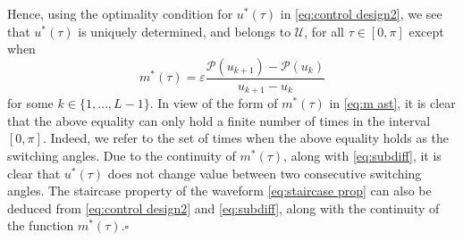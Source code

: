 \documentclass[twocolumn]{autart}    %
\begin{document}
Hence,  using the optimality condition for $u^\ast(\tau)$ in \eqref{eq:control design2}, we see that $u^\ast(\tau)$ is uniquely determined, and belongs to $\mathcal{U}$, for all $\tau\in [0,\pi]$ except when
$$
m^\ast(\tau) = \varepsilon \dfrac{\mathcal{P}(u_{k+1}) - \mathcal{P}(u_k)}{u_{k+1} -u_k}
$$
for some $k\in\{1,\ldots, L-1\}$.
In view of the form of $m^\ast(\tau)$ in \eqref{eq:m ast}, it is clear that the above equality can only hold a finite number of times in the interval $[0,\pi]$. 
Indeed, we refer to the set of times when the above equality holds as the switching angles.
Due to the continuity of $m^\ast(\tau)$, along with \eqref{eq:subdiff}, it is clear that $u^\ast(\tau)$ does not change value between two consecutive switching angles. The staircase property of the waveform \eqref{eq:staircase prop} can also be deduced from \eqref{eq:control design2} and \eqref{eq:subdiff}, along with the continuity of the function $m^\ast(\tau)$.\hfill $\square$
\end{document}
